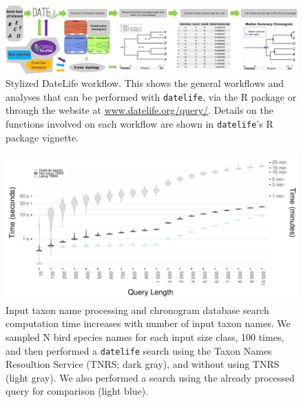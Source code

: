 \documentclass[
  english,
  man]{apa6}
\begin{document}
\begin{figure}[!h]
\includegraphics{../figures/figure1/figure1-horizontal.pdf}
\caption{Stylized DateLife workflow. This shows the general workflows and analyses that can be performed with \texttt{datelife}, via the R package or through the website  at \url{www.datelife.org/query/}. Details on the functions involved on each workflow are shown in \texttt{datelife}'s R package vignette.}
\label{fig:workflow}
\end{figure}
\newpage
\begin{figure}[!h]
\includegraphics[width=1\linewidth]{../figures/fig_runtime_main.pdf}
\caption{Input taxon name processing and chronogram database search computation time increases with number of input taxon names. We sampled N bird species names for each input size class, 100 times, and then performed a \texttt{datelife} search using the Taxon Names Resoultion Service (TNRS; dark gray), and without using TNRS (light gray). We also performed a search using the already processed query for comparison (light blue).}
\label{fig:runtime1}
\end{figure}
\end{document}
